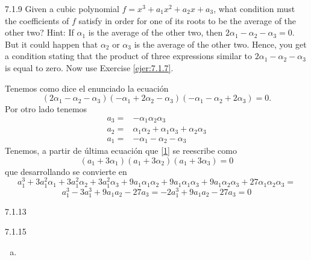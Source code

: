 \documentclass[twoside]{article}
\begin{document}
\newpage
\begin{ejercicio}{7.1.9}
Given a cubic polynomial $f = x^3+a_1x^2+a_2x+a_3$, what condition must the coefficients
of $f$ satisfy in order for one of its roots to be the average of the other two? Hint: If $α_1$ is
the average of the other two, then $2α_1 − α_2 − α_3 = 0$. But it could happen that $α_2$ or
$α_3$ is the average of the other two. Hence, you get a condition stating that the product of
three expressions similar to $2α_1 − α_2 − α_3$ is equal to zero. Now use Exercise \ref{ejer:7.1.7}.
\end{ejercicio}
\begin{solucion}
Tenemos como dice el enunciado la ecuación
\begin{equation}\label{1}
(2α_1 − α_2 − α_3)(-α_1 + 2α_2 − α_3)(-α_1 − α_2 + 2α_3)=0.
\end{equation}
Por otro lado tenemos
\begin{align*}
a_3=&-\alpha_1\alpha_2\alpha_3\\
a_2= & \alpha_1\alpha_2+\alpha_1\alpha_3+\alpha_2\alpha_3\\
a_1=&-\alpha_1-\alpha_2-\alpha_3
\end{align*}
Tenemos, a partir de última ecuación que \ref{1} se reescribe como
\[
(a_1+3\alpha_1)(a_1+3\alpha_2)(a_1+3\alpha_3)=0
\]
que desarrollando se convierte en
\[
a_1^3 + 3a_1^2\alpha_1 + 3a_1^2\alpha_2 + 3a_1^2\alpha_3 + 9a_1\alpha_1\alpha_2+ 9a_1\alpha_1\alpha_3 + 9a_1\alpha_2\alpha_3 + 27\alpha_1\alpha_2\alpha_3=
\]
\[
a_1^3-3a_1^3+9a_1a_2-27a_3=-2a_1^3+9a_1a_2-27a_3=0
\]
\end{solucion}
\newpage

\begin{ejercicio}{7.1.13}

\end{ejercicio}
\begin{solucion}

\end{solucion}

\newpage

\begin{ejercicio}{7.1.15}

\begin{enumerate}[a.]
\item
\end{enumerate}
\end{ejercicio}
\end{document}
